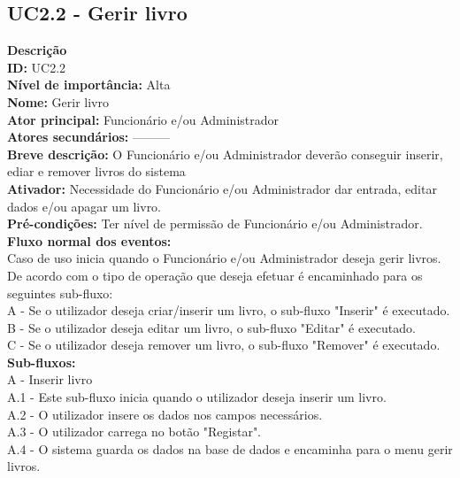 \newpage

\subsection{UC2.2 - Gerir livro}
\vspace*{5mm}

\noindent \textbf{Descrição} \\
\textbf{ID:} UC2.2 \\  
\textbf{Nível de importância:} Alta \\
\textbf{Nome:} Gerir livro \\
\textbf{Ator principal:} Funcionário e/ou Administrador \\
\textbf{Atores secundários:} --------- \\
\textbf{Breve descrição:} O Funcionário e/ou Administrador deverão conseguir inserir, ediar e remover livros do sistema \\ 
\textbf{Ativador:} Necessidade do Funcionário e/ou Administrador dar entrada, editar dados e/ou apagar um livro. \\
\textbf{Pré-condições:} Ter nível de permissão de Funcionário e/ou Administrador. \\
\textbf{Fluxo normal dos eventos:} \\
	\indent Caso de uso inicia quando o Funcionário e/ou Administrador deseja gerir livros. \\
	\indent De acordo com o tipo de operação que deseja efetuar é encaminhado para os seguintes sub-fluxo:\\
	\indent\indent A - Se o utilizador deseja criar/inserir um livro, o sub-fluxo "Inserir" é executado.\\
	\indent\indent B - Se o utilizador deseja editar um livro, o sub-fluxo "Editar" é executado.\\
	\indent\indent C - Se o utilizador deseja remover um livro, o sub-fluxo "Remover" é executado.\\
\textbf{Sub-fluxos:} \\
	\indent A - Inserir livro\\
	\indent\indent A.1 - Este sub-fluxo inicia quando o utilizador deseja inserir um livro.\\
	\indent\indent A.2 - O utilizador insere os dados nos campos necessários.\\	
	\indent\indent A.3 - O utilizador carrega no botão "Registar".\\	
	\indent\indent A.4 - O sistema guarda os dados na base de dados e encaminha para o menu gerir livros.\\	
